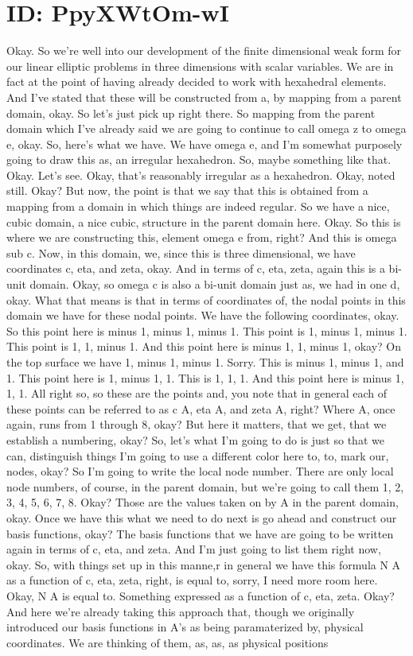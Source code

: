 \documentclass[10pt]{article}
\begin{document}
\section*{ID: PpyXWtOm-wI}
Okay. So we're well into our development of the finite dimensional weak form for our linear elliptic problems in three dimensions with scalar variables. We are in fact at the point of having already decided to work with hexahedral elements. And I've stated that these will be constructed from a, by mapping from a parent domain, okay. So let's just pick up right there. So mapping from the parent domain which I've already said we are going to continue to call omega z to omega e, okay. So, here's what we have. We have omega e, and I'm somewhat purposely going to draw this as, an irregular hexahedron. So, maybe something like that. Okay. Let's see. Okay, that's reasonably irregular as a hexahedron. Okay, noted still. Okay? But now, the point is that we say that this is obtained from a mapping from a domain in which things are indeed regular. So we have a nice, cubic domain, a nice cubic, structure in the parent domain here. Okay. So this is where we are constructing this, element omega e from, right? And this is omega sub c. Now, in this domain, we, since this is three dimensional, we have coordinates c, eta, and zeta, okay. And in terms of c, eta, zeta, again this is a bi-unit domain. Okay, so omega c is also a bi-unit domain just as, we had in one d, okay. What that means is that in terms of coordinates of, the nodal points in this domain we have for these nodal points. We have the following coordinates, okay. So this point here is minus 1, minus 1, minus 1. This point is 1, minus 1, minus 1. This point is 1, 1, minus 1. And this point here is minus 1, 1, minus 1, okay? On the top surface we have 1, minus 1, minus 1. Sorry. This is minus 1, minus 1, and 1. This point here is 1, minus 1, 1. This is 1, 1, 1. And this point here is minus 1, 1, 1. All right so, so these are the points and, you note that in general each of these points can be referred to as c A, eta A, and zeta A, right? Where A, once again, runs from 1 through 8, okay? But here it matters, that we get, that we establish a numbering, okay? So, let's what I'm going to do is just so that we can, distinguish things I'm going to use a different color here to, to, mark our, nodes, okay? So I'm going to write the local node number. There are only local node numbers, of course, in the parent domain, but we're going to call them 1, 2, 3, 4, 5, 6, 7, 8. Okay? Those are the values taken on by A in the parent domain, okay. Once we have this what we need to do next is go ahead and construct our basis functions, okay? The basis functions that we have are going to be written again in terms of c, eta, and zeta. And I'm just going to list them right now, okay. So, with things set up in this manne,r in general we have this formula N A as a function of c, eta, zeta, right, is equal to, sorry, I need more room here. Okay, N A is equal to. Something expressed as a function of c, eta, zeta. Okay? And here we're already taking this approach that, though we originally introduced our basis functions in A's as being paramaterized by, physical coordinates. We are thinking of them, as, as, as physical positions 
\end{document}
